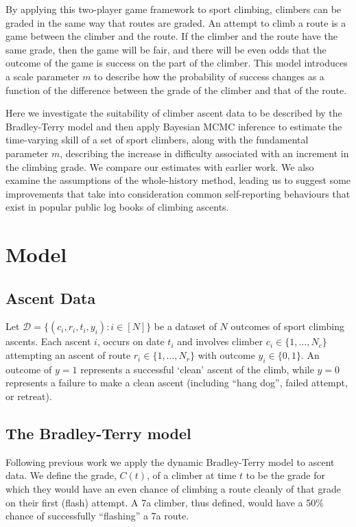 \documentclass{article}
\begin{document}
By applying this two-player game framework to sport climbing, climbers can be graded in the same way that routes are graded. An attempt to climb a route is a game between the climber and the route. If the climber and the route have the same grade, then the game will be fair, and there will be even odds that the outcome of the game is success on the part of the climber. This model introduces a scale parameter $m$ to describe how the probability of success changes as a function of the difference between the grade of the climber and that of the route.

Here we investigate the suitability of climber ascent data to be described by the Bradley-Terry model and then apply Bayesian MCMC inference to estimate the time-varying skill of a set of sport climbers, along with the fundamental parameter $m$, describing the increase in difficulty associated with an increment in the climbing grade. We compare our estimates with earlier work. We also examine the assumptions of the whole-history method, leading us to suggest some improvements that take into consideration common self-reporting behaviours that exist in popular public log books of climbing ascents.

\section*{Model}

\subsection*{Ascent Data}

Let $\mathcal{D} = \{(c_i, r_i, t_i, y_i) : i \in [N]\}$ be a dataset of $N$ outcomes of sport climbing ascents.  Each ascent $i$, occurs on date $t_i$ and involves climber $c_i \in \{1,\dots, N_c\}$ attempting an ascent of route $r_i \in \{1,\dots, N_r\}$ with outcome $y_i \in \{0,1\}$. An outcome of $y=1$ represents a successful `clean' ascent of the climb, while $y=0$ represents a failure to make a clean ascent (including ``hang dog'', failed attempt, or retreat). 

\subsection*{The Bradley-Terry model}

Following previous work  \cite{scarff2020estimation} we apply the dynamic Bradley-Terry model \cite{zermelo1929berechnung,bradley1952rank} to ascent data. We define the grade, $C(t)$, of a climber at time $t$ to be the grade for which they would have an even chance of climbing a route cleanly of that grade on their first (\gls{flash}) attempt. A 7a climber, thus defined, would have a 50\% chance of successfully ``flashing'' a 7a route. 
\end{document}
